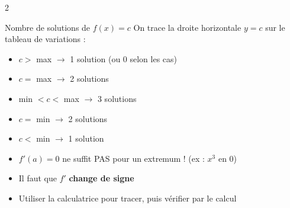 \documentclass[a4paper,10pt]{article}
\begin{document}
\begin{multicols}{2}
\begin{defbox}{Nombre de solutions de $f(x) = c$}
On trace la droite horizontale $y = c$ sur le tableau de variations :
\begin{itemize}[nosep,leftmargin=12pt]
  \item $c >$ max $\to$ 1 solution (ou 0 selon les cas)
  \item $c =$ max $\to$ 2 solutions
  \item min $< c <$ max $\to$ 3 solutions
  \item $c =$ min $\to$ 2 solutions
  \item $c <$ min $\to$ 1 solution
\end{itemize}
\end{defbox}

\begin{attbox}
\begin{itemize}[nosep,leftmargin=12pt]
  \item $f'(a) = 0$ ne suffit PAS pour un extremum ! (ex : $x^3$ en $0$)
  \item Il faut que $f'$ \textbf{change de signe}
  \item Utiliser la calculatrice pour tracer, puis vérifier par le calcul
\end{itemize}
\end{attbox}

\end{multicols}
\end{document}
